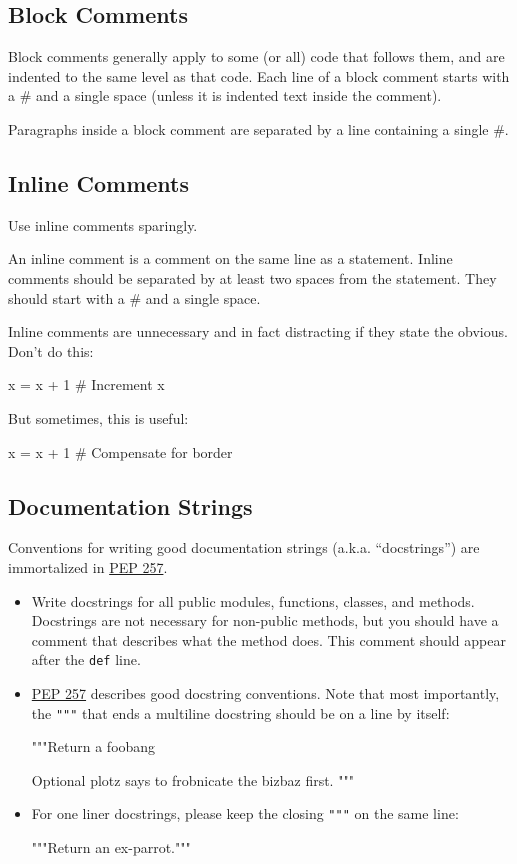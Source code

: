 \documentclass[a4paper,11pt]{article}
\begin{document}
\subsection{Block Comments}
Block comments generally apply to some (or all) code that follows them, and 
are indented to the same level as that code. Each line of a block comment 
starts with a \# and a single space (unless it is indented text inside the 
comment).
\par
Paragraphs inside a block comment are separated by a line containing a single 
\#.
\subsection{Inline Comments}
Use inline comments sparingly.
\par
An inline comment is a comment on the same line as a statement. Inline 
comments should be separated by at least two spaces from the statement. They 
should start with a \# and a single space.
\par
Inline comments are unnecessary and in fact distracting if they state the 
obvious. Don’t do this:
\par
\begin{python}
x = x + 1                 # Increment x
\end{python}
But sometimes, this is useful:
\par
\begin{python}
x = x + 1                 # Compensate for border
\end{python}
\subsection{Documentation Strings}
Conventions for writing good documentation strings (a.k.a. “docstrings”) are
immortalized in
\href{https://peps.python.org/pep-0257/}{PEP 257}.
\par
\begin{itemize}
\item Write docstrings for all public modules, functions, classes, and methods.
Docstrings are not necessary for non-public methods, but you should have a 
comment that describes what the method does. This comment should appear after 
the \verb"def" line.
\item
\href{https://peps.python.org/pep-0257/}{PEP 257} describes good docstring
conventions. Note that most importantly, the \verb!"""! that ends a multiline
docstring should be on a line by itself:
\begin{python}
"""Return a foobang

Optional plotz says to frobnicate the bizbaz first.
"""
\end{python}
\item For one liner docstrings, please keep the closing \verb!"""! on the same
line:
\begin{python}
"""Return an ex-parrot."""
\end{python}
\end{itemize}
\end{document}
